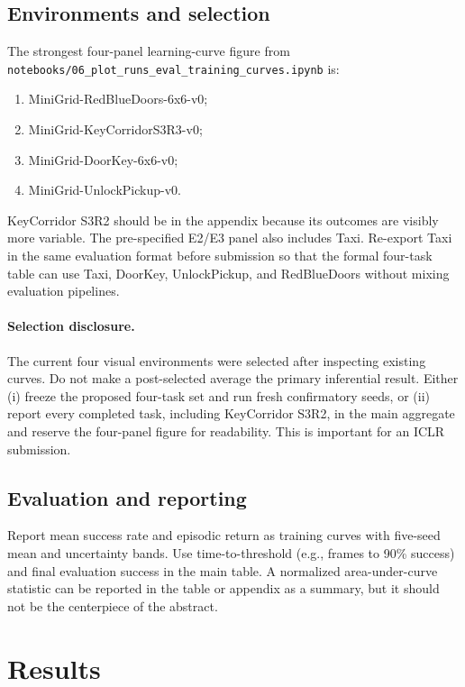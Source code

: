 \documentclass[11pt]{article}
\begin{document}
\subsection{Environments and selection}
The strongest four-panel learning-curve figure from
\texttt{notebooks/06\_plot\_runs\_eval\_training\_curves.ipynb} is:
\begin{enumerate}[leftmargin=1.6em]
  \item MiniGrid-RedBlueDoors-6x6-v0;
  \item MiniGrid-KeyCorridorS3R3-v0;
  \item MiniGrid-DoorKey-6x6-v0;
  \item MiniGrid-UnlockPickup-v0.
\end{enumerate}
KeyCorridor S3R2 should be in the appendix because its outcomes are visibly
more variable. The pre-specified E2/E3 panel also includes Taxi. Re-export Taxi
in the same evaluation format before submission so that the formal four-task
table can use Taxi, DoorKey, UnlockPickup, and RedBlueDoors without mixing
evaluation pipelines.

\paragraph{Selection disclosure.}
The current four visual environments were selected after inspecting existing
curves. Do not make a post-selected average the primary inferential result.
Either (i) freeze the proposed four-task set and run fresh confirmatory seeds,
or (ii) report every completed task, including KeyCorridor S3R2, in the main
aggregate and reserve the four-panel figure for readability. This is important
for an ICLR submission.

\subsection{Evaluation and reporting}
Report mean success rate and episodic return as training curves with five-seed
mean and uncertainty bands. Use time-to-threshold (e.g., frames to 90\% success)
and final evaluation success in the main table. A normalized area-under-curve
statistic can be reported in the table or appendix as a summary, but it should
not be the centerpiece of the abstract.

\section{Results}
\label{sec:results}
\end{document}
